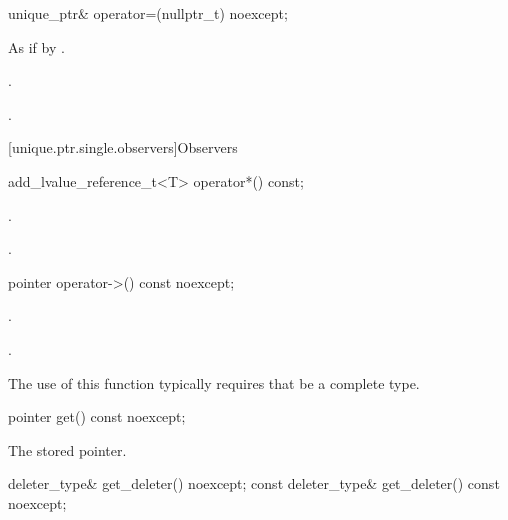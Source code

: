 %
\begin{itemdecl}
unique_ptr& operator=(nullptr_t) noexcept;
\end{itemdecl}

\begin{itemdescr}
\pnum
\effects
As if by .

\pnum
\ensures
{}.

\pnum
\returns
{}.
\end{itemdescr}

[unique.ptr.single.observers]{Observers}

%
\begin{itemdecl}
add_lvalue_reference_t<T> operator*() const;
\end{itemdecl}

\begin{itemdescr}
\pnum
\expects
{}.

\pnum
\returns
{}.
\end{itemdescr}

%
\begin{itemdecl}
pointer operator->() const noexcept;
\end{itemdecl}

\begin{itemdescr}
\pnum
\expects
{}.

\pnum
\returns
{}.

\pnum
\begin{note}
The use of this function typically requires that  be a complete type.
\end{note}
\end{itemdescr}

%
\begin{itemdecl}
pointer get() const noexcept;
\end{itemdecl}

\begin{itemdescr}
\pnum
\returns
The stored pointer.
\end{itemdescr}

%
\begin{itemdecl}
deleter_type& get_deleter() noexcept;
const deleter_type& get_deleter() const noexcept;
\end{itemdecl}

